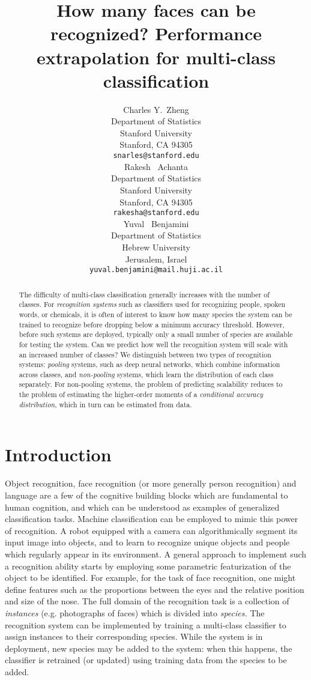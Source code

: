 \documentclass{article}
\title{How many faces can be recognized? Performance extrapolation for
  multi-class classification}
\author{
  Charles Y.~Zheng \\
  Department of Statistics\\
  Stanford University\\
  Stanford, CA 94305 \\
  \texttt{snarles@stanford.edu} \\
  \And
  Rakesh ~Achanta \\
  Department of Statistics\\
  Stanford University\\
  Stanford, CA 94305 \\
  \texttt{rakesha@stanford.edu} \\
  \And
  Yuval ~Benjamini \\
  Department of Statistics \\
  Hebrew University\\
  Jerusalem, Israel\\
  \texttt{yuval.benjamini@mail.huji.ac.il}
}
\begin{document}

\maketitle

\begin{abstract}
The difficulty of multi-class classification generally increases with
the number of classes.  For \emph{recognition systems} such as
classifiers used for recognizing people, spoken words, or chemicals,
it is often of interest to know how many species the system can be
trained to recognize before dropping below a minimum accuracy
threshold.  However, before such systems are deployed, typically only
a small number of species are available for testing the system.  Can
we predict how well the recognition system will scale with an
increased number of classes?  We distinguish between two types of
recognition systems: \emph{pooling} systems, such as deep neural
networks, which combine information across classes, and
\emph{non-pooling} systems, which learn the distribution of each class
separately.  For non-pooling systems, the problem of predicting
scalability reduces to the problem of estimating the higher-order
moments of a \emph{conditional accuracy distribution}, which in turn can
be estimated from data.
\end{abstract}

\section{Introduction}

Object recognition, face recognition (or more generally person
recognition) and language are a few of the cognitive building blocks
which are fundamental to human cognition, and which can be understood
as examples of generalized classification tasks. Machine
classification can be employed to mimic this power of recognition.  A
robot equipped with a camera can algorithmically segment its input
image into objects, and to learn to recognize unique objects and
people which regularly appear in its environment.  A general approach
to implement such a recognition ability starts by employing some
parametric featurization of the object to be identified.  For example,
for the task of face recognition, one might define features such as
the proportions between the eyes and the relative position and size of
the nose.  The full domain of the recognition task is a collection of
\emph{instances} (e.g. photographs of faces) which is divided into
\emph{species.}  The recognition system can be implemented by training
a multi-class classifier to assign instances to their corresponding
species.  While the system is in deployment, new species may be added
to the system: when this happens, the classifier is retrained (or
updated) using training data from the species to be added.
\end{document}
